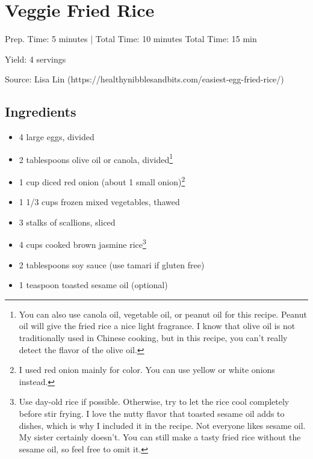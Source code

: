 \section{Veggie Fried Rice}

\begin{center}
Prep. Time: 5 minutes |
Total Time: 10 minutes
Total Time: 15 min

\noindent Yield: 4 servings

\vspace{1em}

  Source: Lisa Lin (https://healthynibblesandbits.com/easiest-egg-fried-rice/)
\end{center}

\subsection{Ingredients}
\begin{multicols}{2}
\begin{itemize}
    \item 4 large eggs, divided
    \item 2 tablespoons olive oil or canola, divided\footnote{You can also use canola oil, vegetable oil, or peanut oil for this recipe. Peanut oil will give the fried rice a nice light fragrance. I know that olive oil is not traditionally used in Chinese cooking, but in this recipe, you can’t really detect the flavor of the olive oil.}
    \item 1 cup diced red onion (about 1 small onion)\footnote{I used red onion mainly for color. You can use yellow or white onions instead.}
    \item 1 1/3 cups frozen mixed vegetables, thawed
    \item 3 stalks of scallions, sliced
    \item 4 cups cooked brown jasmine rice\footnote{Use day-old rice if possible. Otherwise, try to let the rice cool completely before stir frying. I love the nutty flavor that toasted sesame oil adds to dishes, which is why I included it in the recipe.  Not everyone likes sesame oil. My sister certainly doesn’t. You can still make a tasty fried rice without the sesame oil, so feel free to omit it.}
    \item 2 tablespoons soy sauce (use tamari if gluten free)
    \item 1 teaspoon toasted sesame oil (optional)
\end{itemize}
\end{multicols}

